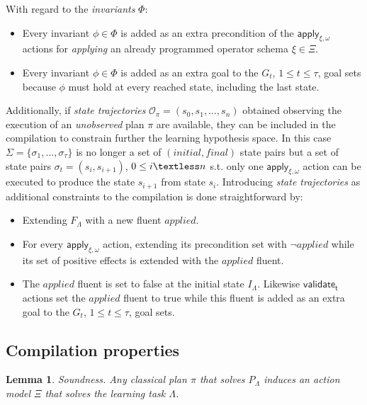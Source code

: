 \documentclass{article}
\newtheorem{lemma}[theorem]{Lemma}
\begin{document}
With regard to the {\em invariants} $\Phi$:
\begin{itemize}
\item Every invariant $\phi\in\Phi$ is added as an extra precondition of the $\mathsf{apply_{\xi,\omega}}$ actions for {\em applying} an already programmed operator schema $\xi\in\Xi$.
\item Every invariant $\phi\in\Phi$ is added as an extra goal to the $G_{t}$, {\tt\small $1\leq t\leq \tau$}, goal sets because $\phi$ must hold at every reached state, including the last state.
\end{itemize}

Additionally, if {\em state trajectories} $\mathcal{O_{\pi}}=(s_0,s_1,\ldots,s_{n})$ obtained observing the execution of an {\em unobserved} plan $\pi$ are available, they can be included in the compilation to constrain further the learning hypothesis space. In this case $\Sigma=\{\sigma_1,\ldots,\sigma_{\tau}\}$ is no longer a set of $(initial, final)$ state pairs but a set of state pairs $\sigma_t=(s_{i},s_{i+1})$, {\tt\small $0\leq i \textless n$} s.t. only one $\mathsf{apply_{\xi,\omega}}$ action can be executed to produce the state $s_{i+1}$ from state $s_{i}$. Introducing {\em state trajectories} as additional constraints to the compilation is done straightforward by:
\begin{itemize}
\item Extending $F_{\Lambda}$ with a new fluent $applied$.
\item For every $\mathsf{apply_{\xi,\omega}}$ action, extending its precondition set with $\neg applied$ while its set of positive effects is extended with the $applied$ fluent.   
\item The $applied$ fluent is set to false at the initial state $I_{\Lambda}$. Likewise $\mathsf{validate_{t}}$ actions set the $applied$ fluent to true while this fluent is added as an extra goal to the $G_{t}$, {\tt\small $1\leq t\leq \tau$}, goal sets.
\end{itemize}


\subsection{Compilation properties}

\begin{lemma}
Soundness. Any classical plan $\pi$ that solves $P_{\Lambda}$ induces an action model $\Xi$ that solves the learning task $\Lambda$.
\end{lemma}
\end{document}
